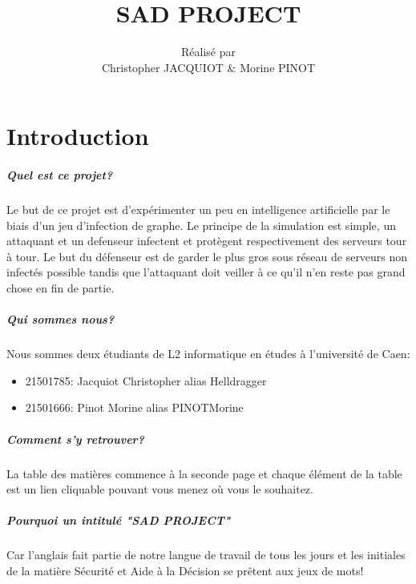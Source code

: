 \documentclass{scrreprt}
\title{\Huge \bfseries SAD PROJECT}
\author{Réalisé par \\Christopher JACQUIOT \& Morine PINOT}
\date{}
\begin{document}
    \maketitle
    \tableofcontents

    \chapter{Introduction}

    \paragraph{Quel est ce projet?}
    Le but de ce projet est d'expérimenter un peu en intelligence artificielle
    par le biais d'un jeu d'infection de graphe.
    Le principe de la simulation est simple, un attaquant et un defenseur
    infectent et protègent respectivement des serveurs tour à tour.
    Le but du défenseur est de garder le plus gros sous réseau de serveurs
    non infectés possible tandis que l'attaquant doit veiller à ce qu'il n'en
    reste pas grand chose en fin de partie.


    \paragraph{Qui sommes nous?}
    Nous sommes deux étudiants de L2 informatique en études à l'université de
    Caen:\\


    \begin{itemize}
        \item 21501785: Jacquiot Christopher alias Helldragger
        \item 21501666: Pinot Morine alias PINOTMorine
    \end{itemize}

    \paragraph{Comment s'y retrouver?}
    La table des matières commence à la seconde page et chaque élément de la
    table est un lien cliquable pouvant vous menez où vous le souhaitez.

    \paragraph{Pourquoi un intitulé "SAD PROJECT"}
    Car l'anglais fait partie de notre langue de travail de tous les jours et
    les initiales de la matière Sécurité et Aide à la Décision se prêtent aux
    jeux de mots!
\end{document}
